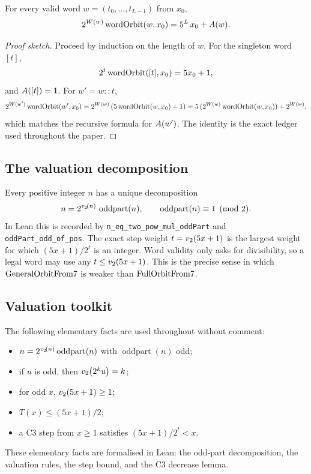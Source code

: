 \begin{theorem}\label{thm:word-identity}
For every valid word $w=(t_0,\dots,t_{L-1})$ from $x_0$,
\begin{equation*}
  2^{W(w)}\,\mathrm{wordOrbit}(w,x_0)
    =5^L\,x_0+A(w).
\end{equation*}
\end{theorem}

\begin{proof}[Proof sketch]
Proceed by induction on the length of $w$.  For the singleton word
$[t]$,
\begin{equation*}
  2^t\,\mathrm{wordOrbit}([t],x_0)=5x_0+1,
\end{equation*}
and $A([t])=1$.  For $w'=w{::}t$,
\begin{equation*}
  2^{W(w')}\,\mathrm{wordOrbit}(w',x_0)
    =2^{W(w)}\,(5\,\mathrm{wordOrbit}(w,x_0)+1)
    =5\,(2^{W(w)}\,\mathrm{wordOrbit}(w,x_0))+2^{W(w)},
\end{equation*}
which matches the recursive formula for $A(w')$.  The identity is
the exact ledger used throughout the paper.
\end{proof}

\subsection{The valuation decomposition}

Every positive integer $n$ has a unique decomposition
\begin{equation*}
  n=2^{v_2\!\left(n\right)}\,\operatorname{oddpart}(n),
\qquad \operatorname{oddpart}(n)\equiv1\pmod2.
\end{equation*}
In Lean this is recorded by \texttt{n\_eq\_two\_pow\_mul\_oddPart} and
\texttt{oddPart\_odd\_of\_pos}.  The exact step weight
$t=v_2\!\left(5x+1\right)$ is the largest weight for which $(5x+1)/2^t$ is an
integer.  Word validity only asks for divisibility, so a legal word may
use any $t\le v_2\!\left(5x+1\right)$.  This is the precise sense in which
$\mathrm{GeneralOrbitFrom7}$ is weaker than $\mathrm{FullOrbitFrom7}$.

\subsection{Valuation toolkit}

The following elementary facts are used throughout without comment:
\begin{itemize}[leftmargin=*]
\item $n=2^{v_2\!\left(n\right)}\operatorname{oddpart}(n)$ with
  $\operatorname{oddpart}(n)$ odd;
\item if $u$ is odd, then $v_2\!\left(2^k u\right)=k$;
\item for odd $x$, $v_2\!\left(5x+1\right)\ge1$;
\item $T(x)\le(5x+1)/2$;
\item a C3 step from $x\ge1$ satisfies $(5x+1)/2^t<x$.
\end{itemize}
These elementary facts are formalised in Lean: the odd-part
decomposition, the valuation rules, the step bound, and the C3
decrease lemma.

